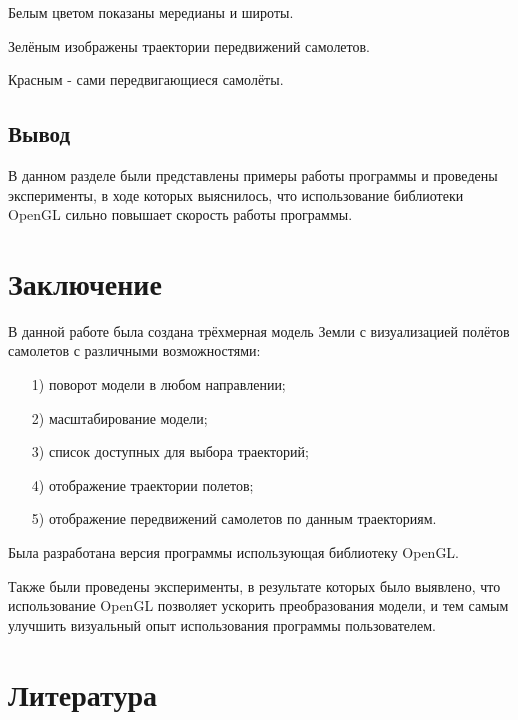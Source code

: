 \documentclass[14pt, a4paper]{extarticle}
\begin{document}
	Белым цветом показаны мередианы и широты.\par
	Зелёным изображены траектории передвижений самолетов.\par
	Красным - сами передвигающиеся самолёты.\par

	\subsection*{Вывод}
	В данном разделе были представлены примеры работы программы и
	проведены эксперименты, в ходе которых выяснилось, что использование библиотеки OpenGL сильно повышает скорость
	работы программы.
	
	\newpage
	\section*{Заключение}
	В данной работе была создана трёхмерная модель Земли с визуализацией полётов самолетов с различными возможностями:
	
	\begin{itemize}
		\item[1)] поворот модели в любом направлении;
		\item[2)] масштабирование модели;
		\item[3)] список доступных для выбора траекторий;
		\item[4)] отображение траектории полетов;
		\item[5)] отображение передвижений самолетов по данным траекториям.
		
	\end{itemize}\par
	
	Была разработана версия программы использующая библиотеку OpenGL.
	
	Также были проведены эксперименты, в результате которых было выявлено, что использование OpenGL позволяет ускорить преобразования модели, и тем самым улучшить визуальный опыт использования программы пользователем.

	\clearpage	
	\section*{Литература}
		
\end{document}
